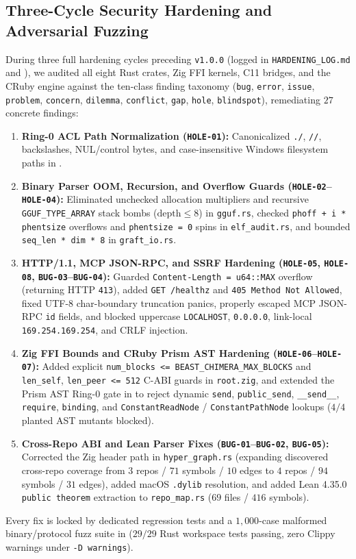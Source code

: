 \documentclass[11pt,letterpaper]{amsart}
\newcommand{\code}[1]{{\small\texttt{#1}}}
\begin{document}
\subsection{Three-Cycle Security Hardening and Adversarial Fuzzing}
During three full hardening cycles preceding \code{v1.0.0} (logged in
\code{HARDENING\_LOG.md} and ),
we audited all eight Rust crates, Zig FFI kernels, C11 bridges, and the CRuby
engine against the ten-class finding taxonomy (\code{bug}, \code{error},
\code{issue}, \code{problem}, \code{concern}, \code{dilemma}, \code{conflict},
\code{gap}, \code{hole}, \code{blindspot}), remediating $27$ concrete findings:
\begin{enumerate}
  \item \textbf{Ring-0 ACL Path Normalization (\code{HOLE-01}):} Canonicalized
  \code{./}, \code{//}, backslashes, NUL/control bytes, and case-insensitive
  Windows filesystem paths in .
  \item \textbf{Binary Parser OOM, Recursion, and Overflow Guards (\code{HOLE-02}--\code{HOLE-04}):}
  Eliminated unchecked allocation multipliers and recursive \code{GGUF\_TYPE\_ARRAY}
  stack bombs ($\mathrm{depth} \le 8$) in \code{gguf.rs}, checked
  \code{phoff + i * phentsize} overflows and \code{phentsize = 0} spins in
  \code{elf\_audit.rs}, and bounded \code{seq\_len * dim * 8} in \code{graft\_io.rs}.
  \item \textbf{HTTP/1.1, MCP JSON-RPC, and SSRF Hardening (\code{HOLE-05}, \code{HOLE-08}, \code{BUG-03}--\code{BUG-04}):}
  Guarded \code{Content-Length = u64::MAX} overflow (returning HTTP \code{413}),
  added \code{GET /healthz} and \code{405 Method Not Allowed}, fixed UTF-8
  char-boundary truncation panics, properly escaped MCP JSON-RPC \code{id} fields,
  and blocked uppercase \code{LOCALHOST}, \code{0.0.0.0}, link-local
  \code{169.254.169.254}, and CRLF injection.
  \item \textbf{Zig FFI Bounds and CRuby Prism AST Hardening (\code{HOLE-06}--\code{HOLE-07}):}
  Added explicit \code{num\_blocks <= BEAST\_CHIMERA\_MAX\_BLOCKS} and
  \code{len\_self}, \code{len\_peer <= 512} C-ABI guards in \code{root.zig}, and extended
  the Prism AST Ring-0 gate in  to reject dynamic
  \code{send}, \code{public\_send}, \code{\_\_send\_\_}, \code{require}, \code{binding},
  and \code{ConstantReadNode} / \code{ConstantPathNode} lookups ($4/4$ planted AST
  mutants blocked).
  \item \textbf{Cross-Repo ABI and Lean Parser Fixes (\code{BUG-01}--\code{BUG-02}, \code{BUG-05}):}
  Corrected the Zig header path in \code{hyper\_graph.rs} (expanding discovered
  cross-repo coverage from $3$ repos / $71$ symbols / $10$ edges to $4$ repos /
  $94$ symbols / $31$ edges), added macOS \code{.dylib} resolution, and added Lean
  4.35.0 \code{public theorem} extraction to \code{repo\_map.rs} ($69$ files /
  $416$ symbols).
\end{enumerate}
Every fix is locked by dedicated regression tests and a $1{,}000$-case malformed
binary/protocol fuzz suite in 
($29/29$ Rust workspace tests passing, zero Clippy warnings under \code{-D warnings}).
\end{document}
